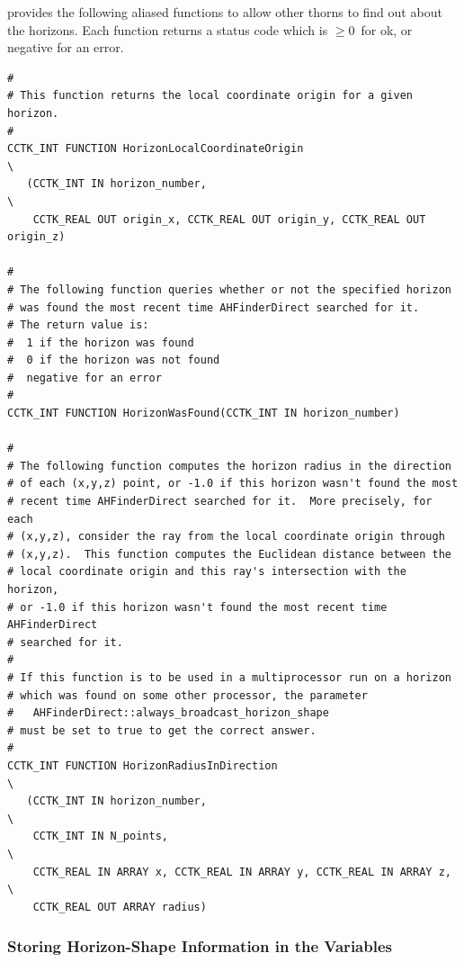  provides the following aliased functions
to allow other thorns to find out about the horizons.  Each function
returns a status code which is $\ge 0$~for ok, or negative for an error.
\begin{verbatim}
#
# This function returns the local coordinate origin for a given horizon.
#
CCTK_INT FUNCTION HorizonLocalCoordinateOrigin                          \
   (CCTK_INT IN horizon_number,                                         \
    CCTK_REAL OUT origin_x, CCTK_REAL OUT origin_y, CCTK_REAL OUT origin_z)

#
# The following function queries whether or not the specified horizon
# was found the most recent time AHFinderDirect searched for it.
# The return value is:
#  1 if the horizon was found
#  0 if the horizon was not found
#  negative for an error
#
CCTK_INT FUNCTION HorizonWasFound(CCTK_INT IN horizon_number)

#
# The following function computes the horizon radius in the direction
# of each (x,y,z) point, or -1.0 if this horizon wasn't found the most
# recent time AHFinderDirect searched for it.  More precisely, for each
# (x,y,z), consider the ray from the local coordinate origin through
# (x,y,z).  This function computes the Euclidean distance between the
# local coordinate origin and this ray's intersection with the horizon,
# or -1.0 if this horizon wasn't found the most recent time AHFinderDirect
# searched for it.  
#
# If this function is to be used in a multiprocessor run on a horizon
# which was found on some other processor, the parameter
#   AHFinderDirect::always_broadcast_horizon_shape
# must be set to true to get the correct answer.
#
CCTK_INT FUNCTION HorizonRadiusInDirection                              \
   (CCTK_INT IN horizon_number,                                         \
    CCTK_INT IN N_points,                                               \
    CCTK_REAL IN ARRAY x, CCTK_REAL IN ARRAY y, CCTK_REAL IN ARRAY z,   \
    CCTK_REAL OUT ARRAY radius)
\end{verbatim}


\subsubsection{Storing Horizon-Shape Information in the  Variables}

